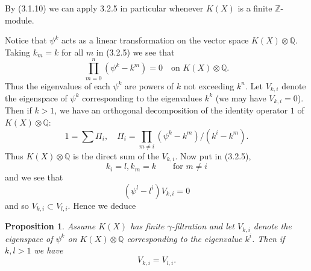\documentclass[leqno]{book}
\numberwithin{equation}{section}
\newtheorem{proposition}[theorem]{Proposition}
\theoremstyle{definition}
\begin{document}
            By (3.1.10) we can apply 3.2.5 in particular whenever $K(X)$ is a finite $\mathbb{Z}$-module.

            Notice that $\psi^{k}$ acts as a linear transformation on the vector space $K(X)\otimes \mathbb{Q}$. Taking $k_{m}=k$ for all $m$ in (3.2.5) we see that
            \begin{equation*}
              \prod_{m=0}^{n} (\psi^{k}-k^{m})=0 \quad \text{on } K(X)\otimes \mathbb{Q}. 
            \end{equation*}
            Thus the eigenvalues of each $\psi^{k}$ are powers of $k$ not exceeding $k^{n}$. Let $V_{k,i}$ denote the eigenspace of $\psi^{k}$ corresponding to the eigenvalues $k^{k}$ (we may have $V_{k,i}=0$). Then if $k>1$, we have an orthogonal decomposition of the identity operator $1$ of $K(X)\otimes \mathbb{Q}$:
            \begin{equation*}
              1=\sum \Pi_{i}, \quad \Pi_{i}=\prod_{m\neq i}^{} (\psi^{k}-k^{m})/(k^{i}-k^{m}).
            \end{equation*}
            Thus $K(X)\otimes \mathbb{Q}$ is the direct sum of the $V_{k,i}$. Now put in (3.2.5),
            \begin{equation*}
              k_{i}=l, k_{m}=k \qquad \text{for } m\neq i 
            \end{equation*}
            and we see that 
            \begin{equation*}
              (\psi^{l}- l^{i})V_{k,i}=0
            \end{equation*}
            and so $V_{k,i} \subset V_{l,i}$. Hence we deduce

            \begin{proposition}
              Assume $K(X)$ has finite $\gamma$-filtration and let $V_{k,i}$ denote the eigenspace of $\psi^{k}$ on $K(X)\otimes \mathbb{Q}$ corresponding to the eigenvalue $k^{i}$. Then if $k,l>1$ we have
              \begin{equation*}
                V_{k,i}=V_{l,i}.
              \end{equation*}
            \end{proposition}
\end{document}
